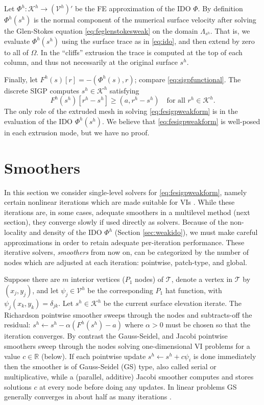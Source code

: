 \documentclass[letterpaper,final,12pt,reqno]{amsart}
\theoremstyle{claim}
\newcommand{\RR}{\mathbb{R}}
\newcommand{\ip}[2]{\left(#1,#2\right)}
\numberwithin{equation}{section}
\numberwithin{figure}{section}
\numberwithin{table}{section}
\numberwithin{theorem}{section}
\begin{document}
Let $\Phi^h:\mathcal{K}^h \to (\mathcal{V}^h)'$ be the FE approximation of the IDO $\Phi$.  By definition $\Phi^h(s^h)$ is the normal component of the numerical surface velocity after solving the Glen-Stokes equation \eqref{eq:feglenstokesweak} on the domain $\Lambda_{s^h}$.  That is, we evaluate $\Phi^h(s^h)$ using the surface trace as in \eqref{eq:ido}, and then extend by zero to all of $\Omega$.  In the ``cliffs'' extrusion the trace is computed at the top of each column, and thus not necessarily at the original surface $s^h$.

Finally, let $F^h(s)[r] = - \ip{\Phi^h(s)}{r}$; compare \eqref{eq:sigpfunctional}.  The discrete SIGP computes $s^h \in \mathcal{K}^h$ satisfying
\begin{equation}
F^h(s^h)[r^h - s^h] \ge \ip{a}{r^h-s^h} \quad \text{for all } r^h \in \mathcal{K}^h. \label{eq:fesigpweakform}
\end{equation}
The only role of the extruded mesh in solving \eqref{eq:fesigpweakform} is in the evaluation of the IDO $\Phi^h(s^h)$.  We believe that \eqref{eq:fesigpweakform} is well-posed in each extrusion mode, but we have no proof.


\section{Smoothers} \label{sec:smoothers}

In this section we consider single-level solvers for \eqref{eq:fesigpweakform}, namely certain nonlinear iterations which are made suitable for VIs \cite{KinderlehrerStampacchia1980}.  While these iterations are, in some cases, adequate smoothers in a multilevel method (next section), they converge slowly if used directly as solvers.  Because of the non-locality and density of the IDO $\Phi^h$ (Section \ref{sec:weakido}), we must make careful approximations in order to retain adequate per-iteration performance.  These iterative solvers, \emph{smoothers} from now on, can be categorized by the number of nodes which are adjusted at each iteration: pointwise, patch-type, and global.

Suppose there are $m$ interior vertices ($P_1$ nodes) of $\mathcal{T}$, denote a vertex in $\mathcal{T}$ by $(x_j,y_j)$, and let $\psi_j \in \mathcal{V}^h$ be the corresponding $P_1$ hat function, with $\psi_j(x_k,y_k)=\delta_{jk}$.  Let $s^h\in \mathcal{K}^h$ be the current surface elevation iterate.  The Richardson pointwise smoother sweeps through the nodes and subtracts-off the residual: $s^h \gets s^h - \alpha (F^h(s^h)-a)$ where $\alpha>0$ must be chosen so that the iteration converges.  By contrast the Gauss-Seidel, and Jacobi pointwise smoothers sweep through the nodes solving one-dimensional VI problems for a value $c\in \RR$ (below).  If each pointwise update $s^h \gets s^h + c \psi_i$ is done immediately then the smoother is of Gauss-Seidel (GS) type, also called serial or multiplicative, while a (parallel, additive) Jacobi smoother computes and stores solutions $c$ at every node before doing any updates.  In linear problems GS generally converges in about half as many iterations \cite{Greenbaum1997}.
\end{document}
